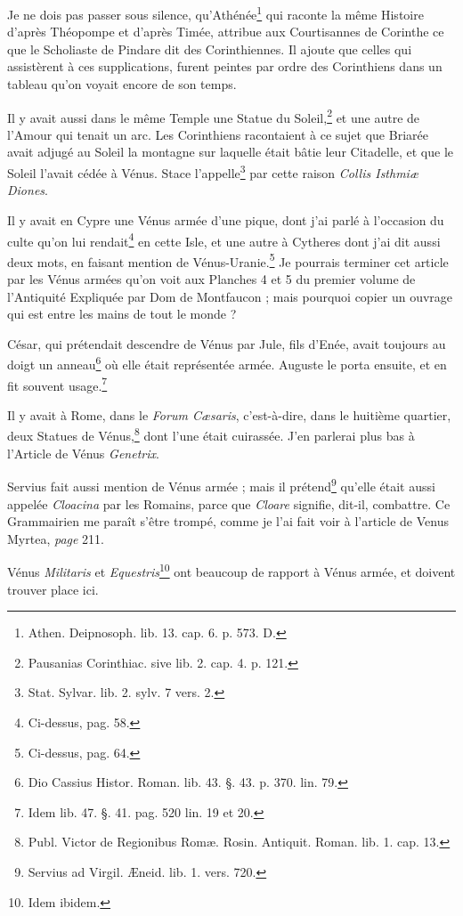 \documentclass[a4paper, 18pt, oneside]{article}
\begin{document}
Je ne dois pas passer sous silence, qu'Athénée\footnote{Athen. Deipnosoph. lib. 13. cap. 6. p. 573. D.} qui raconte la même Histoire d'après Théopompe et d'après Timée, attribue aux Courtisannes de Corinthe ce que le Scholiaste de Pindare dit des Corinthiennes. Il ajoute que celles qui assistèrent à ces supplications, furent peintes par ordre des Corinthiens dans un tableau qu'on voyait encore de son temps.

Il y avait aussi dans le même Temple une Statue du Soleil,\footnote{Pausanias Corinthiac. sive lib. 2. cap. 4. p. 121.} et une autre de l'Amour qui tenait un arc. Les Corinthiens racontaient à ce sujet que Briarée avait adjugé au Soleil la montagne sur laquelle était bâtie leur Citadelle, et que le Soleil l'avait cédée à Vénus. Stace l'appelle\footnote{Stat. Sylvar. lib. 2. sylv. 7 vers. 2.} par cette raison \emph{Collis Isthmiæ Diones}.

Il y avait en Cypre une Vénus armée d'une pique, dont j'ai parlé à l'occasion du culte qu'on lui rendait\footnote{Ci-dessus, pag. 58.} en cette Isle, et une autre à Cytheres dont j'ai dit aussi deux mots, en faisant mention de Vénus-Uranie.\footnote{Ci-dessus, pag. 64.} Je pourrais terminer cet article par les Vénus armées qu'on voit aux Planches 4 et 5 du premier volume de l'Antiquité Expliquée par Dom de Montfaucon ; mais pourquoi copier un ouvrage qui est entre les mains de tout le monde ?

César, qui prétendait descendre de Vénus par Jule, fils d'Enée, avait toujours au doigt un anneau\footnote{Dio Cassius Histor. Roman. lib. 43. §. 43. p. 370. lin. 79.} où elle était représentée armée. Auguste le porta ensuite, et en fit souvent usage.\footnote{Idem lib. 47. §. 41. pag. 520 lin. 19 et 20.}

Il y avait à Rome, dans le \emph{Forum Cæsaris}, c'est-à-dire, dans le huitième quartier, deux Statues de Vénus,\footnote{Publ. Victor de Regionibus Romæ. Rosin. Antiquit. Roman. lib. 1. cap. 13.} dont l'une était cuirassée. J'en parlerai plus bas à l'Article de Vénus \emph{Genetrix}.

Servius fait aussi mention de Vénus armée ; mais il prétend\footnote{Servius ad Virgil. Æneid. lib. 1. vers. 720.} qu'elle était aussi appelée \emph{Cloacina} par les Romains, parce que \emph{Cloare} signifie, dit-il, combattre. Ce Grammairien me paraît s'être trompé, comme je l'ai fait voir à l'article de Venus Myrtea, \emph{page} 211.

Vénus \emph{Militaris} et \emph{Equestris}\footnote{Idem ibidem.} ont beaucoup de rapport à Vénus armée, et doivent trouver place ici.
\end{document}
